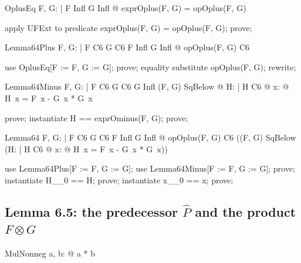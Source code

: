 \documentclass{article}
\begin{document}
\begin{theorem}{OplusEq}
  \forall F, G: \nat \fun \nat | F \in Infl \land G \in Infl @ exprOplus(F, G) = opOplus(F, G)
\end{theorem}

\begin{zproof}
apply UFExt to predicate exprOplus(F, G) = opOplus(F, G);
prove;
\end{zproof}

\begin{theorem}{Lemma64Plus}
  \forall F, G: \nat \fun \nat | F \in C6 \land G \in C6 \land F \in Infl \land G \in Infl @
    opOplus(F, G) \in C6
\end{theorem}

\begin{zproof}
use OplusEq[F := F, G := G];
prove;
equality substitute opOplus(F, G);
rewrite;
\end{zproof}

\begin{theorem}{Lemma64Minus}
  \forall F, G: \nat \fun \nat | F \in C6 \land G \in C6 \land G \in Infl \land (F, G) \in SqBelow @
    \exists H: \nat \fun \nat | H \in C6 @ \forall x: \nat @ H~x = F~x - G~x * G~x
\end{theorem}

\begin{zproof}
prove;
instantiate H == exprOminus(F, G);
prove;
\end{zproof}

\begin{theorem}{Lemma64}
  \forall F, G: \nat \fun \nat | F \in C6 \land G \in C6 \land F \in Infl \land G \in Infl @
    opOplus(F, G) \in C6 \land ((F, G) \in SqBelow \implies
      (\exists H: \nat \fun \nat | H \in C6 @ \forall x: \nat @ H~x = F~x - G~x * G~x))
\end{theorem}

\begin{zproof}
use Lemma64Plus[F := F, G := G];
use Lemma64Minus[F := F, G := G];
prove;
instantiate H\_\_0 == H;
prove;
instantiate x\_\_0 == x;
prove;
\end{zproof}

\subsection{Lemma 6.5: the predecessor $\hat P$ and the product $F \otimes G$}

\begin{theorem}{MulNonneg}
  \forall a, b: \nat @ a * b 
\end{theorem}
\end{document}

